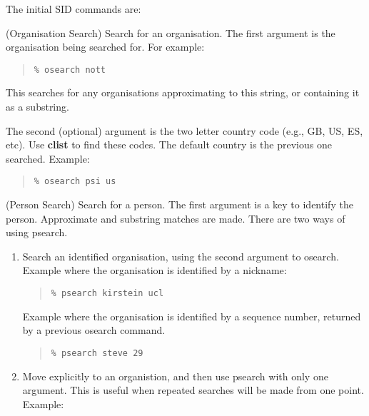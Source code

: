 The initial SID commands are:

\begin{describe}

\item[\verb+osearch+:] (Organisation Search) Search for an organisation.  The first argument is the
organisation being searched for.  For example:

\begin{quote}\begin{verbatim}
% osearch nott
\end{verbatim}\end{quote}

This searches for any organisations approximating to this string, or
containing it as a substring.

The second (optional) argument is the two letter country code (e.g., GB, US,
ES, etc).  Use {\bf clist} to find these codes.  The default country is the
previous one searched.  Example:

\begin{quote}\begin{verbatim}
% osearch psi us
\end{verbatim}\end{quote}

\item[\verb+psearch+:] (Person Search) Search for a person.  The first argument is a key to identify
the person.  Approximate and substring matches are made.
There are two ways of using psearch.  


\begin{enumerate}
\item Search an identified organisation, using the second argument to
osearch.  Example where the organisation is identified by a nickname:

\begin{quote}\begin{verbatim}
% psearch kirstein ucl
\end{verbatim}\end{quote}

Example where the organisation is identified by a sequence number, 
returned by a previous osearch command.

\begin{quote}\begin{verbatim}
% psearch steve 29 
\end{verbatim}\end{quote}


\item Move explicitly to an organistion, and then use psearch with only one
argument.  This is useful when repeated searches will be made from one point.
Example:


\end{enumerate}
\end{describe}
